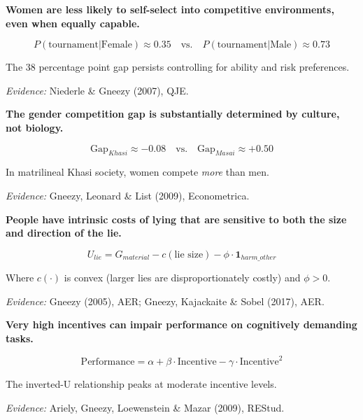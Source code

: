 \begin{tcolorbox}[colback=red!5!white,colframe=red!75!black,title=Axiom GN-2: Gender Competition Gap]
\textbf{Women are less likely to self-select into competitive environments, even when equally capable.}

\begin{equation}
P(\text{tournament} | \text{Female}) \approx 0.35 \quad \text{vs.} \quad P(\text{tournament} | \text{Male}) \approx 0.73
\end{equation}

The 38 percentage point gap persists controlling for ability and risk preferences.

\textit{Evidence:} Niederle \& Gneezy (2007), QJE.
\end{tcolorbox}

\begin{tcolorbox}[colback=red!5!white,colframe=red!75!black,title=Axiom GN-3: Cultural Malleability of Gender Gap]
\textbf{The gender competition gap is substantially determined by culture, not biology.}

\begin{equation}
\text{Gap}_{Khasi} \approx -0.08 \quad \text{vs.} \quad \text{Gap}_{Masai} \approx +0.50
\end{equation}

In matrilineal Khasi society, women compete \textit{more} than men.

\textit{Evidence:} Gneezy, Leonard \& List (2009), Econometrica.
\end{tcolorbox}

\begin{tcolorbox}[colback=red!5!white,colframe=red!75!black,title=Axiom GN-4: Lying Aversion]
\textbf{People have intrinsic costs of lying that are sensitive to both the size and direction of the lie.}

\begin{equation}
U_{lie} = G_{material} - c(\text{lie size}) - \phi \cdot \mathbf{1}_{harm\_other}
\end{equation}

Where $c(\cdot)$ is convex (larger lies are disproportionately costly) and $\phi > 0$.

\textit{Evidence:} Gneezy (2005), AER; Gneezy, Kajackaite \& Sobel (2017), AER.
\end{tcolorbox}

\begin{tcolorbox}[colback=red!5!white,colframe=red!75!black,title=Axiom GN-5: High Stakes Choking]
\textbf{Very high incentives can impair performance on cognitively demanding tasks.}

\begin{equation}
\text{Performance} = \alpha + \beta \cdot \text{Incentive} - \gamma \cdot \text{Incentive}^2
\end{equation}

The inverted-U relationship peaks at moderate incentive levels.

\textit{Evidence:} Ariely, Gneezy, Loewenstein \& Mazar (2009), REStud.
\end{tcolorbox}

